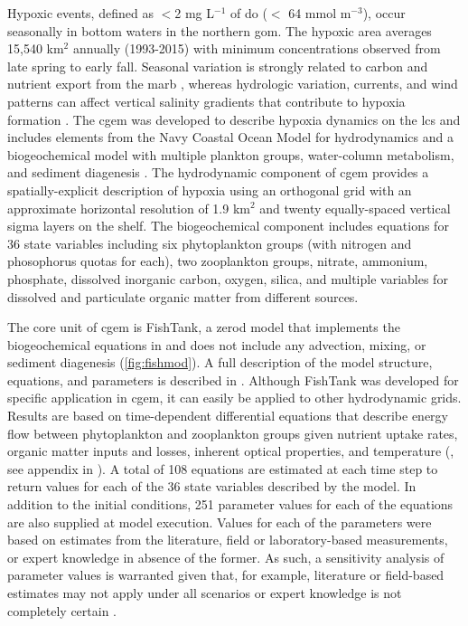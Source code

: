 \documentclass[review]{elsarticle}\usepackage[]{graphicx}\usepackage[]{color}
\begin{document}
Hypoxic events, defined  as $<$2 mg L$^{-1}$ of \ac{do} ($<$ 64 mmol m$^{-3}$), occur seasonally in bottom waters in the northern \ac{gom}.  The hypoxic area averages 15,540 km$^2$ annually (1993-2015) with minimum concentrations observed from late spring to early fall.  Seasonal variation is strongly related to carbon and nutrient export from the \ac{marb} \citep{Lohrenz08,Bianchi10}, whereas hydrologic variation, currents, and wind patterns can affect vertical salinity gradients that contribute to hypoxia formation \citep{Wiseman97,Paerl98,Obenour15}. The \ac{cgem} was developed to describe hypoxia dynamics on the \ac{lcs} and includes elements from the Navy Coastal Ocean Model \citep{Martin00} for hydrodynamics and a biogeochemical model with multiple plankton groups, water-column metabolism, and sediment diagenesis \citep{Eldridge10}.  The hydrodynamic component of \ac{cgem} provides a spatially-explicit description of hypoxia using an orthogonal grid with an approximate horizontal resolution of 1.9 km$^2$ and twenty equally-spaced vertical sigma layers on the shelf.  The biogeochemical component includes equations for 36 state variables including six phytoplankton groups (with nitrogen and phosophorus quotas for each), two zooplankton groups, nitrate, ammonium, phosphate, dissolved inorganic carbon, oxygen, silica, and multiple variables for dissolved and particulate organic matter from different sources.

The core unit of \ac{cgem} is FishTank, a \ac{zerod} model that implements the biogeochemical equations in \citet{Eldridge10} and does not include any advection, mixing, or sediment diagenesis (\cref{fig:fishmod}). A full description of the model structure, equations, and parameters is described in \citet{Lehrter17}. Although FishTank was developed for specific application in \ac{cgem}, it can easily be applied to other hydrodynamic grids. Results are based on time-dependent differential equations that describe energy flow between phytoplankton and zooplankton groups given nutrient uptake rates, organic matter inputs and losses, inherent optical properties, and temperature (\citealt{Penta08,Eldridge10}, see appendix in \citealt{Lehrter17}). A total of 108 equations are estimated at each time step to return values for each of the 36 state variables described by the model.  In addition to the initial conditions, 251 parameter values for each of the equations are also supplied at model execution. Values for each of the parameters were based on estimates from the literature, field or laboratory-based measurements, or expert knowledge in absence of the former.  As such, a sensitivity analysis of parameter values is warranted given that, for example, literature or field-based estimates may not apply under all scenarios or expert knowledge is not completely certain \citep{Refsgaard07}.
\end{document}
